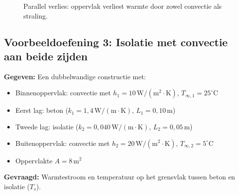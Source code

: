 \documentclass[a4paper,11pt,twoside]{report}
\begin{document}
\begin{figure}[H]
    \centering
    \caption{Parallel verlies: oppervlak verliest warmte door zowel convectie als straling.}
\end{figure}

\subsection*{Voorbeeldoefening 3: Isolatie met convectie aan beide zijden}

\textbf{Gegeven:} 
Een dubbelwandige constructie met:
\begin{itemize}
    \item Binnenoppervlak: convectie met $h_1=10\,\mathrm{W/(m^2\cdot K)}$, $T_{\infty,1}=25^\circ\mathrm{C}$
    \item Eerst lag: beton ($k_1=1{,}4\,\mathrm{W/(m\cdot K)}$, $L_1=0{,}10\,\mathrm{m}$)
    \item Tweede lag: isolatie ($k_2=0{,}040\,\mathrm{W/(m\cdot K)}$, $L_2=0{,}05\,\mathrm{m}$)
    \item Buitenoppervlak: convectie met $h_2=20\,\mathrm{W/(m^2\cdot K)}$, $T_{\infty,2}=5^\circ\mathrm{C}$
    \item Oppervlakte $A=8\,\mathrm{m^2}$
\end{itemize}

\textbf{Gevraagd:} 
Warmtestroom en temperatuur op het grensvlak tussen beton en isolatie ($T_s$).
\end{document}
